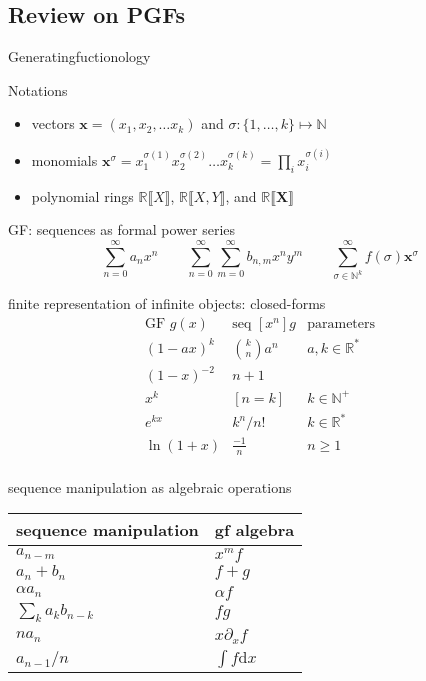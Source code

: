 \documentclass[8pt]{beamer}
\renewcommand{\S}[1]{ \llbracket #1 \rrbracket }
\begin{document}
\subsection{Review on PGFs}
\begin{frame}[allowframebreaks]{Generatingfuctionology\cite{gfbook}}
	\begin{block}{Notations}
		\begin{itemize}
			\item vectors \(\mathbf{x} = (x_1,x_2,\ldots x_k)\) and \(\sigma: \{1,\ldots,k\}\mapsto \mathbb{N}\)
			\item monomials \(\mathbf{x}^\sigma = x_1^{\sigma(1)} x_2^{\sigma(2)} \ldots x_k^{\sigma(k)} = \prod_i x_i^{\sigma(i)}\)
			\item polynomial rings \(\mathbb{R}\S{X}\), \(\mathbb{R}\S{X,Y}\), and \(\mathbb{R}\S{\mathbf{X}}\)
		\end{itemize}
	\end{block}
	\begin{block}{GF: sequences as formal power series}
		\[
			\sum_{n=0}^\infty a_n x^n
			\qquad
			\sum_{n=0}^\infty\sum_{m=0}^\infty b_{n,m} x^n y^m
			\qquad
			\sum_{\sigma \in\mathbb{N}^k}^\infty f(\sigma) \mathbf{x}^\sigma
		\]
	\end{block}
	\begin{block}{finite representation of infinite objects: closed-forms}
		\[
			\begin{array}{l|l|l}
				\hline
				\text{GF }g(x) & \text{seq }[x^n]g & \text{parameters}       \\
				\hline
				(1-ax)^k       & \binom{k}{n}a^n   & a,k\in\mathbb{R}^{\ast} \\
				(1-x)^{-2}     & n+1               &                         \\
				x^k            & [n=k]             & k\in\mathbb{N}^{+}      \\
				e^{kx}         & k^n/n!            & k\in\mathbb{R}^{\ast}   \\
				\ln(1+x)       & \frac{-1}{n}      & n\geq 1                 \\
			\end{array}
		\]
	\end{block}
	\begin{block}{sequence manipulation as algebraic operations}
		\centering
		\begin{tabular}{l|l}
			\hline
			sequence manipulation   & gf algebra             \\
			\hline
			\(a_{n-m}\)             & \(x^m f\)              \\
			\(a_{n} + b_{n}\)       & \(f+g\)                \\
			\(\alpha a_{n}\)        & \(\alpha f\)           \\
			\(\sum_k a_{k}b_{n-k}\) & \(fg\)                 \\
			\(n a_n\)               & \(x \partial_x f\)     \\
			\(a_{n-1}/n\)           & \(\int f \mathrm{d}x\) \\
		\end{tabular}
	\end{block}


\end{frame}
\end{document}
